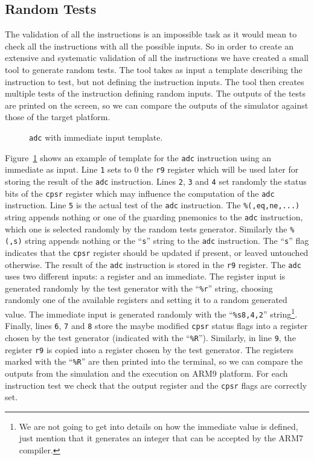 \subsection{Random Tests}
\label{sec:str7_validation_random_tests}

The validation of all the instructions is an impossible task as it would mean to check all the instructions with all the possible inputs.
So in order to create an extensive and systematic validation of all the instructions we have created a small tool to generate random tests.
The tool takes as input a template describing the instruction to test, but not defining the instruction inputs.
The tool then creates multiple tests of the instruction defining random inputs.
The outputs of the tests are printed on the screen, so we can compare the outputs of the simulator against those of the target platform.

\begin{figure}[!h]
	
	\caption{\texttt{adc} with immediate input template.}
	\label{fig:str7_validation_adc_imm_template}
\end{figure}

Figure~\ref{fig:str7_validation_adc_imm_template} shows an example of template for the \texttt{adc} instruction using an immediate as input.
Line \texttt{1} sets to 0 the \texttt{r9} register which will be used later for storing the result of the \texttt{adc} instruction.
Lines \texttt{2}, \texttt{3} and \texttt{4} set randomly the status bits of the \texttt{cpsr} register which may influence the computation of the \texttt{adc} instruction.
Line \texttt{5} is the actual test of the \texttt{adc} instruction. 
The \texttt{\%(,eq,ne,...)} string appends nothing or one of the guarding pnemonics to the \texttt{adc} instruction, which one is selected randomly by the random tests generator.
Similarly the \texttt{\%(,s)} string appends nothing or the ``\texttt{s}'' string to the \texttt{adc} instruction.
The ``\texttt{s}'' flag indicates that the \texttt{cpsr} register should be updated if present, or leaved untouched otherwise.
The result of the \texttt{adc} instruction is stored in the \texttt{r9} register.
The \texttt{adc} uses two different inputs: a register and an immediate.
The register input is generated randomly by the test generator with the ``\texttt{\%r}'' string, choosing randomly one of the available registers and setting it to a random generated value.
The immediate input is generated randomly with the ``\texttt{\%s8,4,2}'' string\footnote{We are not going to get into details on how the immediate value is defined, just mention that it generates an integer that can be accepted by the ARM7 compiler.}.
Finally, lines \texttt{6}, \texttt{7} and \texttt{8} store the maybe modified \texttt{cpsr} status flags into a register chosen by the test generator (indicated with the ``\texttt{\%R}'').
Similarly, in line \texttt{9}, the register \texttt{r9} is copied into a register chosen by the test generator.
The registers marked with the ``\texttt{\%R}'' are then printed into the terminal, so we can compare the outputs from the simulation and the execution on ARM9 platform.
For each instruction test we check that the output register and the \texttt{cpsr} flags are correctly set.

